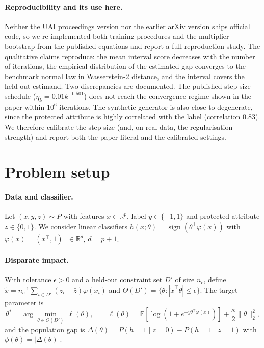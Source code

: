 \documentclass[11pt]{article}
\newcommand{\E}{\mathbb{E}}
\newcommand{\R}{\mathbb{R}}
\newcommand{\Dp}{D'}
\begin{document}
\paragraph{Reproducibility and its use here.} Neither the UAI proceedings version nor the earlier arXiv version \citep{roy2023uq} ships official code, so we
re-implemented both training procedures and the multiplier bootstrap from the published equations and
report a full reproduction study.  The qualitative claims reproduce: the mean interval score
decreases with the number of iterations, the empirical distribution of the estimated gap converges to
the benchmark normal law in Wasserstein-2 distance, and the interval covers the held-out estimand.
Two discrepancies are documented.  The published step-size schedule ($\eta_k=0.01k^{-0.501}$) does not reach the convergence regime shown in the paper within $10^6$ iterations.  The synthetic generator
is also close to degenerate, since the protected attribute is highly correlated with the label
(correlation $0.83$).  We
therefore calibrate the step size (and, on real data, the regularisation strength) and report both
the paper-literal and the calibrated settings.

\section{Problem setup}
\label{sec:setup}

\paragraph{Data and classifier.} Let $(x,y,z)\sim P$ with features $x\in\R^p$, label
$y\in\{-1,1\}$ and protected attribute $z\in\{0,1\}$.  We consider linear classifiers
$h(x;\theta)=\operatorname{sign}(\theta^\top\varphi(x))$ with $\varphi(x)=(x^\top,1)^\top
\in\R^d$, $d=p+1$.

\paragraph{Disparate impact.} With tolerance $\epsilon>0$ and a held-out constraint set
$\Dp$ of size $n_c$, define
$\tilde x=n_c^{-1}\sum_{i\in\Dp}(z_i-\bar z)\varphi(x_i)$ and
$\Theta(\Dp)=\{\theta:|\tilde x^\top\theta|\le\epsilon\}$.  The target parameter is
\begin{equation}\label{eq:theta}
\theta^*=\arg\min_{\theta\in\Theta(\Dp)}\ \ell(\theta),\qquad
\ell(\theta)=\E[\log(1+e^{-y\theta^\top\varphi(x)})]+\frac{\kappa}{2}\|\theta\|_2^2 ,
\end{equation}
and the population gap is $\Delta(\theta)=P(h=1\mid z=0)-P(h=1\mid z=1)$ with
$\phi(\theta)=|\Delta(\theta)|$.
\end{document}
